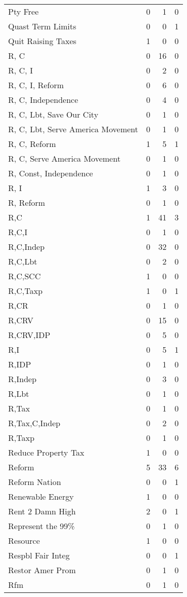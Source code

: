 \begin{supertabular}{lrrr}
Pty Free & 0 & 1 & 0\\
Quast Term Limits & 0 & 0 & 1\\
Quit Raising Taxes & 1 & 0 & 0\\
R, C & 0 & 16 & 0\\
R, C, I & 0 & 2 & 0\\
R, C, I, Reform & 0 & 6 & 0\\
R, C, Independence & 0 & 4 & 0\\
R, C, Lbt, Save Our City & 0 & 1 & 0\\
R, C, Lbt, Serve America Movement & 0 & 1 & 0\\
R, C, Reform & 1 & 5 & 1\\
R, C, Serve America Movement & 0 & 1 & 0\\
R, Const, Independence & 0 & 1 & 0\\
R, I & 1 & 3 & 0\\
R, Reform & 0 & 1 & 0\\
R,C & 1 & 41 & 3\\
R,C,I & 0 & 1 & 0\\
R,C,Indep & 0 & 32 & 0\\
R,C,Lbt & 0 & 2 & 0\\
R,C,SCC & 1 & 0 & 0\\
R,C,Taxp & 1 & 0 & 1\\
R,CR & 0 & 1 & 0\\
R,CRV & 0 & 15 & 0\\
R,CRV,IDP & 0 & 5 & 0\\
R,I & 0 & 5 & 1\\
R,IDP & 0 & 1 & 0\\
R,Indep & 0 & 3 & 0\\
R,Lbt & 0 & 1 & 0\\
R,Tax & 0 & 1 & 0\\
R,Tax,C,Indep & 0 & 2 & 0\\
R,Taxp & 0 & 1 & 0\\
Reduce Property Tax & 1 & 0 & 0\\
Reform & 5 & 33 & 6\\
Reform Nation & 0 & 0 & 1\\
Renewable Energy & 1 & 0 & 0\\
Rent 2 Damn High & 2 & 0 & 1\\
Represent the 99\% & 0 & 1 & 0\\
Resource & 1 & 0 & 0\\
Respbl Fair Integ & 0 & 0 & 1\\
Restor Amer Prom & 0 & 1 & 0\\
Rfm & 0 & 1 & 0\\

\end{supertabular}
